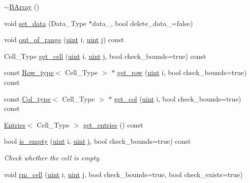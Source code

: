 \begin{DoxyCompactItemize}
\item 
\hyperlink{class_b_array_af39acdf29aa5999a7f5fd48141be384e}{$\sim$\+B\+Array} ()
\item 
void \hyperlink{class_b_array_accf44b49caa7746a462a3ac9b6024cfc}{set\+\_\+data} (Data\+\_\+\+Type $\ast$data\+\_\+, bool delete\+\_\+data\+\_\+=false)
\item 
void \hyperlink{class_b_array_a87bad4dcad82009d5721d21808b7e469}{out\+\_\+of\+\_\+range} (\hyperlink{typedefs_8hpp_a91ad9478d81a7aaf2593e8d9c3d06a14}{uint} i, \hyperlink{typedefs_8hpp_a91ad9478d81a7aaf2593e8d9c3d06a14}{uint} j) const
\item 
Cell\+\_\+\+Type \hyperlink{class_b_array_a4096e4447f91ba52766587a08c62f1fa}{get\+\_\+cell} (\hyperlink{typedefs_8hpp_a91ad9478d81a7aaf2593e8d9c3d06a14}{uint} i, \hyperlink{typedefs_8hpp_a91ad9478d81a7aaf2593e8d9c3d06a14}{uint} j, bool check\+\_\+bounds=true) const
\item 
const \hyperlink{typedefs_8hpp_a83d6ee40a2ba22844108bb8b82e9b951}{Row\+\_\+type}$<$ Cell\+\_\+\+Type $>$ $\ast$ \hyperlink{class_b_array_a2c969ceb1d37eff9ebcac25741de1808}{get\+\_\+row} (\hyperlink{typedefs_8hpp_a91ad9478d81a7aaf2593e8d9c3d06a14}{uint} i, bool check\+\_\+bounds=true) const
\item 
const \hyperlink{typedefs_8hpp_a00f3fedec1671706175b572e5c57ee0b}{Col\+\_\+type}$<$ Cell\+\_\+\+Type $>$ $\ast$ \hyperlink{class_b_array_a90bd31bc0b3fa59d11150cd4ea39b3b6}{get\+\_\+col} (\hyperlink{typedefs_8hpp_a91ad9478d81a7aaf2593e8d9c3d06a14}{uint} i, bool check\+\_\+bounds=true) const
\item 
\hyperlink{class_entries}{Entries}$<$ Cell\+\_\+\+Type $>$ \hyperlink{class_b_array_aee224325422d214624771a5b4d91b55e}{get\+\_\+entries} () const
\item 
bool \hyperlink{class_b_array_a37ed3962c0ee5030b23cb6cde23a5cdf}{is\+\_\+empty} (\hyperlink{typedefs_8hpp_a91ad9478d81a7aaf2593e8d9c3d06a14}{uint} i, \hyperlink{typedefs_8hpp_a91ad9478d81a7aaf2593e8d9c3d06a14}{uint} j, bool check\+\_\+bounds=true) const
\begin{DoxyCompactList}\small\item\em Check whether the cell is empty. \end{DoxyCompactList}\item 
void \hyperlink{class_b_array_aaead894ff275479db4f733793ce037db}{rm\+\_\+cell} (\hyperlink{typedefs_8hpp_a91ad9478d81a7aaf2593e8d9c3d06a14}{uint} i, \hyperlink{typedefs_8hpp_a91ad9478d81a7aaf2593e8d9c3d06a14}{uint} j, bool check\+\_\+bounds=true, bool check\+\_\+exists=true)

\end{DoxyCompactItemize}
